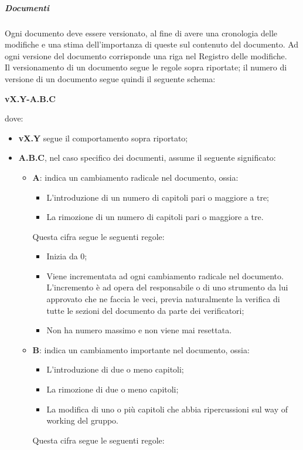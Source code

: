 \documentclass[../norme-di-progetto.tex]{subfiles}
\begin{document}
\subparagraph{Documenti}
Ogni documento deve essere versionato, al fine di avere una cronologia delle modifiche e una stima dell'importanza di queste sul contenuto del documento. Ad ogni versione del documento corrisponde una riga nel Registro delle modifiche. \\
Il versionamento di un documento segue le regole sopra riportate; il numero di versione di un documento segue quindi il seguente schema:
\begin{center}
  \centering
  \textbf{vX.Y-A.B.C}
\end{center} dove:
\begin{itemize}
  \item \textbf{vX.Y} segue il comportamento sopra riportato;
  \item \textbf{A.B.C}, nel caso specifico dei documenti, assume il seguente significato:
  \begin{itemize}
    \item \textbf{A}: indica un cambiamento radicale nel documento, ossia:
    \begin{itemize}
      \item L'introduzione di un numero di capitoli pari o maggiore a tre;
      \item La rimozione di un numero di capitoli pari o maggiore a tre.
    \end{itemize}
    Questa cifra segue le seguenti regole:
    \begin{itemize}
      \item Inizia da 0;
      \item Viene incrementata ad ogni cambiamento radicale nel documento. L'incremento è ad opera del responsabile o di uno strumento da lui approvato che ne faccia le veci, previa naturalmente la verifica di tutte le sezioni del documento da parte dei verificatori;
      \item Non ha numero massimo e non viene mai resettata.
    \end{itemize}
    \item \textbf{B}: indica un cambiamento importante nel documento, ossia:
    \begin{itemize}
      \item L'introduzione di due o meno capitoli;
      \item La rimozione di due o meno capitoli;
      \item La modifica di uno o più capitoli che abbia ripercussioni sul way of working del gruppo.
    \end{itemize}
    Questa cifra segue le seguenti regole:

\end{itemize}
\end{itemize}
\end{document}
